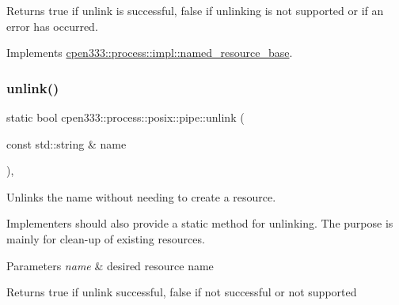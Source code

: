\begin{DoxyReturn}{Returns}
{\ttfamily true} if unlink is successful, {\ttfamily false} if unlinking is not supported or if an error has occurred. 
\end{DoxyReturn}


Implements \hyperlink{classcpen333_1_1process_1_1impl_1_1named__resource__base_ae4033f82dfd068b917a9bca57d3a0c45}{cpen333\+::process\+::impl\+::named\+\_\+resource\+\_\+base}.

\mbox{\label{classcpen333_1_1process_1_1posix_1_1pipe_aef89e04134417c569972bd565741622b}} 
\subsubsection{\texorpdfstring{unlink()}{unlink()}\hspace{0.1cm}{\footnotesize\ttfamily [2/2]}}
{\footnotesize\ttfamily static bool cpen333\+::process\+::posix\+::pipe\+::unlink (\begin{DoxyParamCaption}\item[{const std\+::string \&}]{name }\end{DoxyParamCaption})\hspace{0.3cm}{\ttfamily [inline]}, {\ttfamily [static]}}



Unlinks the name without needing to create a resource. 

Implementers should also provide a static method for unlinking. The purpose is mainly for clean-\/up of existing resources.


\begin{DoxyParams}{Parameters}
{\em name} & desired resource name \\
\hline
\end{DoxyParams}
\begin{DoxyReturn}{Returns}
{\ttfamily true} if unlink successful, {\ttfamily false} if not successful or not supported 
\end{DoxyReturn}
\mbox{\label{classcpen333_1_1process_1_1posix_1_1pipe_a6aeb644645944b435c32928db1349aa7}} 
